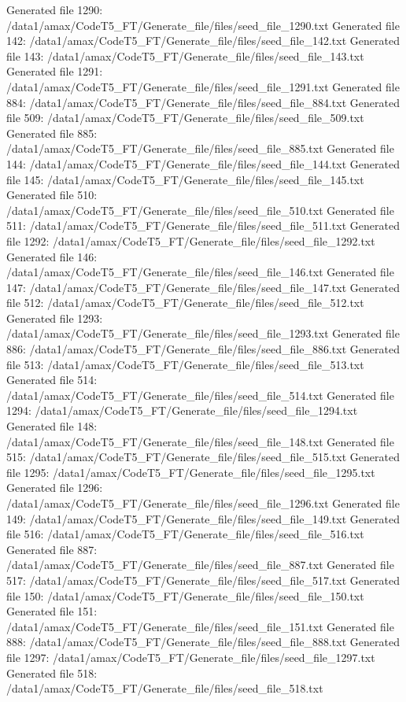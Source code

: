 Generated file 1290: /data1/amax/CodeT5_FT/Generate_file/files/seed_file_1290.txt
Generated file 142: /data1/amax/CodeT5_FT/Generate_file/files/seed_file_142.txt
Generated file 143: /data1/amax/CodeT5_FT/Generate_file/files/seed_file_143.txt
Generated file 1291: /data1/amax/CodeT5_FT/Generate_file/files/seed_file_1291.txt
Generated file 884: /data1/amax/CodeT5_FT/Generate_file/files/seed_file_884.txt
Generated file 509: /data1/amax/CodeT5_FT/Generate_file/files/seed_file_509.txt
Generated file 885: /data1/amax/CodeT5_FT/Generate_file/files/seed_file_885.txt
Generated file 144: /data1/amax/CodeT5_FT/Generate_file/files/seed_file_144.txt
Generated file 145: /data1/amax/CodeT5_FT/Generate_file/files/seed_file_145.txt
Generated file 510: /data1/amax/CodeT5_FT/Generate_file/files/seed_file_510.txt
Generated file 511: /data1/amax/CodeT5_FT/Generate_file/files/seed_file_511.txt
Generated file 1292: /data1/amax/CodeT5_FT/Generate_file/files/seed_file_1292.txt
Generated file 146: /data1/amax/CodeT5_FT/Generate_file/files/seed_file_146.txt
Generated file 147: /data1/amax/CodeT5_FT/Generate_file/files/seed_file_147.txt
Generated file 512: /data1/amax/CodeT5_FT/Generate_file/files/seed_file_512.txt
Generated file 1293: /data1/amax/CodeT5_FT/Generate_file/files/seed_file_1293.txt
Generated file 886: /data1/amax/CodeT5_FT/Generate_file/files/seed_file_886.txt
Generated file 513: /data1/amax/CodeT5_FT/Generate_file/files/seed_file_513.txt
Generated file 514: /data1/amax/CodeT5_FT/Generate_file/files/seed_file_514.txt
Generated file 1294: /data1/amax/CodeT5_FT/Generate_file/files/seed_file_1294.txt
Generated file 148: /data1/amax/CodeT5_FT/Generate_file/files/seed_file_148.txt
Generated file 515: /data1/amax/CodeT5_FT/Generate_file/files/seed_file_515.txt
Generated file 1295: /data1/amax/CodeT5_FT/Generate_file/files/seed_file_1295.txt
Generated file 1296: /data1/amax/CodeT5_FT/Generate_file/files/seed_file_1296.txt
Generated file 149: /data1/amax/CodeT5_FT/Generate_file/files/seed_file_149.txt
Generated file 516: /data1/amax/CodeT5_FT/Generate_file/files/seed_file_516.txt
Generated file 887: /data1/amax/CodeT5_FT/Generate_file/files/seed_file_887.txt
Generated file 517: /data1/amax/CodeT5_FT/Generate_file/files/seed_file_517.txt
Generated file 150: /data1/amax/CodeT5_FT/Generate_file/files/seed_file_150.txt
Generated file 151: /data1/amax/CodeT5_FT/Generate_file/files/seed_file_151.txt
Generated file 888: /data1/amax/CodeT5_FT/Generate_file/files/seed_file_888.txt
Generated file 1297: /data1/amax/CodeT5_FT/Generate_file/files/seed_file_1297.txt
Generated file 518: /data1/amax/CodeT5_FT/Generate_file/files/seed_file_518.txt
